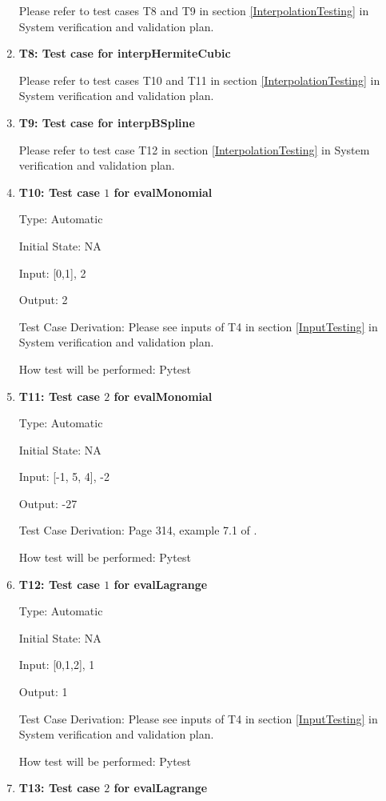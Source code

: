 \documentclass[12pt, titlepage]{article}
\begin{document}
\begin{enumerate}
Please refer to test cases T8 and T9 in section \ref{InterpolationTesting} in 
System verification 
and 
validation plan.

\item{\textbf{T8: Test case for interpHermiteCubic}}

Please refer to test cases T10 and T11 in section \ref{InterpolationTesting} in 
System verification and validation plan.


\item{\textbf{T9: Test case for interpBSpline}}

Please refer to test case T12 in section \ref{InterpolationTesting} in System 
verification and validation plan.


\item{\textbf{T10: Test case $1$ for evalMonomial}}

Type: Automatic

Initial State: NA 

Input: [0,1], 2 

Output: 2

Test Case Derivation: Please see inputs of T4 in section \ref{InputTesting} in 
System verification and validation plan. 

How test will be performed: Pytest



\item{\textbf{T11: Test case $2$ for evalMonomial}}

Type: Automatic

Initial State: NA 

Input: [-1, 5, 4], -2 

Output: -27

Test Case Derivation: Page 314, example 7.1 of \cite{Health1997}. 

How test will be performed: Pytest



\item{\textbf{T12: Test case $1$ for evalLagrange}}

Type: Automatic

Initial State: NA 

Input: [0,1,2], 1 

Output: 1

Test Case Derivation: Please see inputs of T4 in section \ref{InputTesting} in 
System verification and validation plan.

How test will be performed: Pytest

\item{\textbf{T13: Test case $2$ for evalLagrange}}


\end{enumerate}
\end{document}

